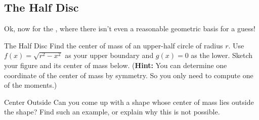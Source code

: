 \subsection{The Half Disc} Ok, now for the , where there isn't even a reasonable geometric basis for a guess!  \begin{exercise}{The Half Disc \Coffeecup \Coffeecup} Find the center of mass of an upper-half circle of radius $r$.  Use $f(x)=\sqrt{r^2-x^2}$ as your upper boundary and $g(x)=0$ as the lower.  Sketch your figure and its center of mass below.  ({\bf Hint:} You can determine one coordinate of the center of mass by symmetry.  So you only need to compute one of the moments.)

\end{exercise}

\begin{exercise}{Center Outside \Coffeecup \Coffeecup \Coffeecup \Coffeecup}
 Can you come up with a shape whose center of mass lies outside the shape?  Find such an example, or explain why this is not possible. 
 \vspace*{3in}
 
\end{exercise}
